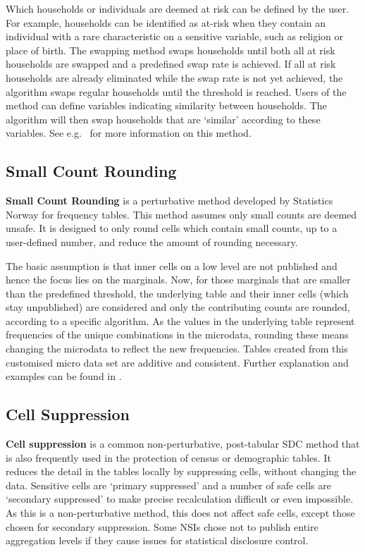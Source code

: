 Which households or individuals are deemed at risk can be defined by the user. For example, households can be identified as at-risk when they contain an individual with a rare characteristic on a sensitive variable, such as religion or place of birth. The swapping method swaps households until both all at risk households are swapped and a predefined swap rate is achieved. If all at risk households are already eliminated while the swap rate is not yet achieved, the algorithm swaps regular households until the threshold is reached. Users of the method can define variables indicating similarity between households. The algorithm will then swap households that are `similar' according to these variables. See e.g.~\cite{TRS_Shlomo} for more information on this method.


\subsection{Small Count Rounding} \label{section:small_count_rounding}
\textbf{Small Count Rounding} is a perturbative method developed by Statistics Norway for frequency tables\cite{langsrudalgorithm}. This method assumes only small counts are deemed unsafe. It is designed to only round cells which contain small counts, up to a user-defined number, and reduce the amount of rounding necessary.

The basic assumption is that inner cells on a low level are not published and hence the focus lies on the marginals. Now, for those marginals that are smaller than the predefined threshold, the underlying table and their inner cells (which stay unpublished) are considered and only the contributing counts are rounded, according to a specific algorithm. As the values in the underlying table represent frequencies of the unique combinations in the microdata, rounding these means changing the microdata to reflect the new frequencies. Tables created from this customised micro data set are additive and consistent. Further explanation and examples can be found in \cite{langsrudalgorithm}. 

\subsection{Cell Suppression}

\textbf{Cell suppression} is a common non-perturbative, post-tabular SDC method that is also frequently used in the protection of census or demographic tables. It reduces the detail in the tables locally by suppressing cells, without changing the data. Sensitive cells are `primary suppressed' and a number of safe cells are `secondary suppressed' to make precise recalculation difficult or even impossible. As this is a non-perturbative method, this does not affect safe cells, except those chosen for secondary suppression. Some NSIs chose not to publish entire aggregation levels if they cause issues for statistical disclosure control. 



